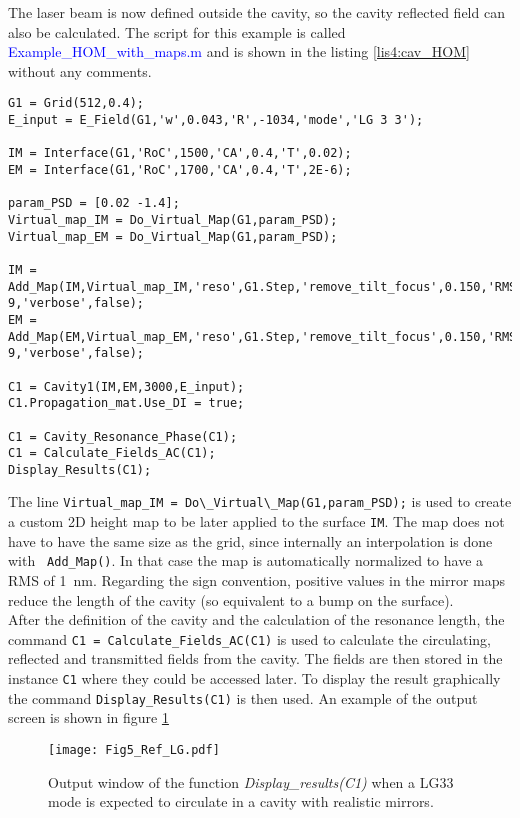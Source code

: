 The laser beam is now defined outside the cavity, so the cavity reflected field can also be calculated. The script for this example is called \textcolor{blue}{Example\_HOM\_with\_maps.m} and is shown in the listing \ref{lis4:cav_HOM} without any comments.\\

\begin{lstlisting}[float=htp,caption=Example of OSCAR script to calculate the reflected field from a cavity with maps \label{lis4:cav_HOM},frame=lines]
G1 = Grid(512,0.4);
E_input = E_Field(G1,'w',0.043,'R',-1034,'mode','LG 3 3');

IM = Interface(G1,'RoC',1500,'CA',0.4,'T',0.02);
EM = Interface(G1,'RoC',1700,'CA',0.4,'T',2E-6);

param_PSD = [0.02 -1.4];
Virtual_map_IM = Do_Virtual_Map(G1,param_PSD);
Virtual_map_EM = Do_Virtual_Map(G1,param_PSD);

IM = Add_Map(IM,Virtual_map_IM,'reso',G1.Step,'remove_tilt_focus',0.150,'RMS',1E-9,'verbose',false);
EM = Add_Map(EM,Virtual_map_EM,'reso',G1.Step,'remove_tilt_focus',0.150,'RMS',1E-9,'verbose',false);

C1 = Cavity1(IM,EM,3000,E_input);
C1.Propagation_mat.Use_DI = true;

C1 = Cavity_Resonance_Phase(C1);
C1 = Calculate_Fields_AC(C1);
Display_Results(C1);
\end{lstlisting}

The line \verb|Virtual_map_IM = Do\_Virtual\_Map(G1,param_PSD);| is used to create a custom 2D height map to be later applied to the surface \verb|IM|. The map does not have to have the same size as the grid, since internally an interpolation is done with  \verb| Add_Map()|. In that case the map is automatically normalized to have a RMS of 1~nm.
Regarding the sign convention, positive values in the mirror maps reduce the length of the cavity (so equivalent to a bump on the surface).\\

After the definition of the cavity and the calculation of the resonance length, the command \verb|C1 = Calculate_Fields_AC(C1)| is used to calculate the circulating, reflected and transmitted fields from the cavity. The fields are then stored in the instance \verb|C1| where they could be accessed later. To display the result graphically the command \verb|Display_Results(C1)| is then used. An example of the output screen is shown in figure \ref{fig5:LG33}

\begin{figure}
\begin{center}
\texttt{[image: Fig5\_Ref\_LG.pdf]}
\end{center}
\caption{\label{fig5:LG33} Output window of the function \emph{Display\_results(C1)} when a LG33 mode is expected to circulate in a cavity with realistic mirrors.}
\end{figure}

